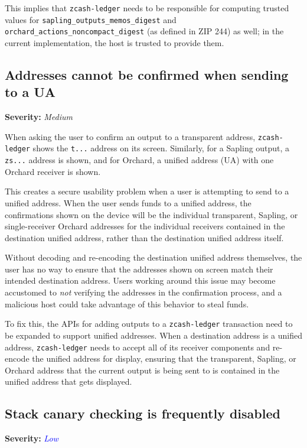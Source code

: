 \documentclass[10pt,titlepage]{article}
\newcommand{\MediumIssue}{\textcolor{darkyellow}{\emph{Medium}}}
\newcommand{\LowIssue}{\textcolor{blue}{\emph{Low}}}
\begin{document}
This implies that \texttt{zcash-ledger} needs to be responsible for computing
trusted values for \texttt{sapling\_outputs\_memos\_digest} and
\texttt{orchard\_actions\_noncompact\_digest} (as defined in ZIP 244) as well;
in the current implementation, the host is trusted to provide them.

\subsection{Addresses cannot be confirmed when sending to a UA} \label{issueuas}
\textbf{Severity:} \MediumIssue

When asking the user to confirm an output to a transparent address,
\texttt{zcash-ledger} shows the \texttt{t...} address on its screen. Similarly,
for a Sapling output, a \texttt{zs...} address is shown, and for Orchard, a
unified address (UA) with one Orchard receiver is shown.

This creates a secure usability problem when a user is attempting to send to a
unified address. When the user sends funds to a unified address, the
confirmations shown on the device will be the individual transparent, Sapling,
or single-receiver Orchard addresses for the individual receivers contained in
the destination unified address, rather than the destination unified address
itself.

Without decoding and re-encoding the destination unified address themselves, the
user has no way to ensure that the addresses shown on screen match their
intended destination address. Users working around this issue may become
accustomed to \emph{not} verifying the addresses in the confirmation process,
and a malicious host could take advantage of this behavior to steal funds.

To fix this, the APIs for adding outputs to a \texttt{zcash-ledger} transaction
need to be expanded to support unified addresses. When a destination address is
a unified address, \texttt{zcash-ledger} needs to accept all of its receiver
components and re-encode the unified address for display, ensuring that the
transparent, Sapling, or Orchard address that the current output is being sent
to is contained in the unified address that gets displayed.

\subsection{Stack canary checking is frequently disabled} \label{issuestackcanaries}
\textbf{Severity:} \LowIssue
\end{document}
